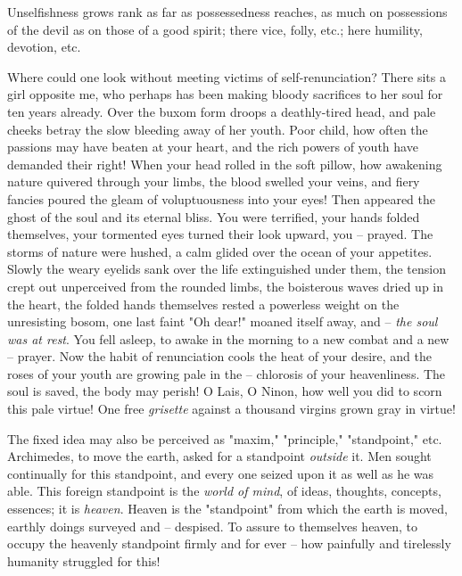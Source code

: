 Unselfishness grows rank as far as possessedness reaches, as much on 
possessions of the devil as on those of a good spirit; there vice, folly, 
etc.; here humility, devotion, etc.

Where could one look without meeting victims of self-renunciation? There sits 
a girl opposite me, who perhaps has been making bloody sacrifices to her soul 
for ten years already. Over the buxom form droops a deathly-tired head, and 
pale cheeks betray the slow bleeding away of her youth. Poor child, how often 
the passions may have beaten at your heart, and the rich powers of youth have 
demanded their right! When your head rolled in the soft pillow, how awakening 
nature quivered through your limbs, the blood swelled your veins, and fiery 
fancies poured the gleam of voluptuousness into your eyes! Then appeared the 
ghost of the soul and its eternal bliss. You were terrified, your hands folded 
themselves, your tormented eyes turned their look upward, you -- prayed. The 
storms of nature were hushed, a calm glided over the ocean of your appetites. 
Slowly the weary eyelids sank over the life extinguished under them, the 
tension crept out unperceived from the rounded limbs, the boisterous waves 
dried up in the heart, the folded hands themselves rested a powerless weight 
on the unresisting bosom, one last faint "{}Oh dear!"{} moaned itself away, 
and -- \textit{the soul was at rest}. You fell asleep, to awake in the morning 
to a new combat and a new -- prayer. Now the habit of renunciation cools the 
heat of your desire, and the roses of your youth are growing pale in the -- 
chlorosis of your heavenliness. The soul is saved, the body may perish! O 
Lais, O Ninon, how well you did to scorn this pale virtue! One free 
\textit{grisette} against a thousand virgins grown gray in virtue!

The fixed idea may also be perceived as "{}maxim,"{} "{}principle,"{} 
"{}standpoint,"{} etc. Archimedes, to move the earth, asked for a standpoint 
\textit{outside} it. Men sought continually for this standpoint, and every one 
seized upon it as well as he was able. This foreign standpoint is the 
\textit{world of mind}, of ideas, thoughts, concepts, essences; it is 
\textit{heaven}. Heaven is the "{}standpoint"{} from which the earth is moved, 
earthly doings surveyed and -- despised. To assure to themselves heaven, to 
occupy the heavenly standpoint firmly and for ever -- how painfully and 
tirelessly humanity struggled for this!

